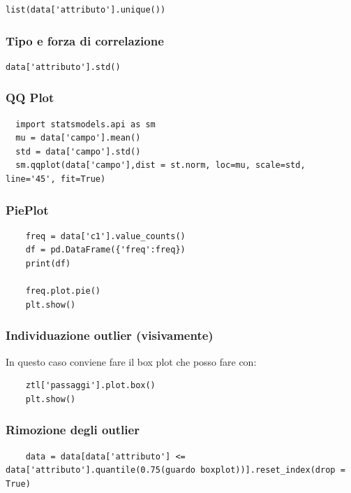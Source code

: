 \documentclass{article}
\begin{document}
\begin{lstlisting}
list(data['attributo'].unique())
\end{lstlisting}

\subsubsection*{Tipo e forza di correlazione}

\begin{lstlisting}
data['attributo'].std()
\end{lstlisting}

\subsubsection*{QQ Plot}

\begin{lstlisting}
  import statsmodels.api as sm
  mu = data['campo'].mean()
  std = data['campo'].std()
  sm.qqplot(data['campo'],dist = st.norm, loc=mu, scale=std, line='45', fit=True)
\end{lstlisting}

\subsubsection*{PiePlot}

\begin{lstlisting}
    freq = data['c1'].value_counts()
    df = pd.DataFrame({'freq':freq})
    print(df)

    freq.plot.pie()
    plt.show()
\end{lstlisting}

\subsubsection*{Individuazione outlier (visivamente)}

In questo caso conviene fare il box plot che posso fare con:

\begin{lstlisting}
    ztl['passaggi'].plot.box()
    plt.show()
\end{lstlisting}

\subsubsection*{Rimozione degli outlier}

\begin{lstlisting}
    data = data[data['attributo'] <= data['attributo'].quantile(0.75(guardo boxplot))].reset_index(drop = True)
\end{lstlisting}
\end{document}
